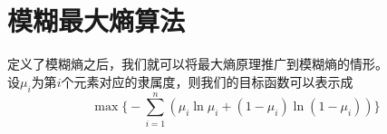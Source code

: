 \newpage
\section{模糊最大熵算法}
定义了模糊熵之后，我们就可以将最大熵原理推广到模糊熵的情形。\\
设$\mu_i$为第$i$个元素对应的隶属度，则我们的目标函数可以表示成
\[
    \max \biggl\{-\sum_{i=1}^{n}\left(\mu_i \ln \mu_i+\left(1-\mu_i\right) \ln \left(1-\mu_i\right)\right)\biggr\}
\]